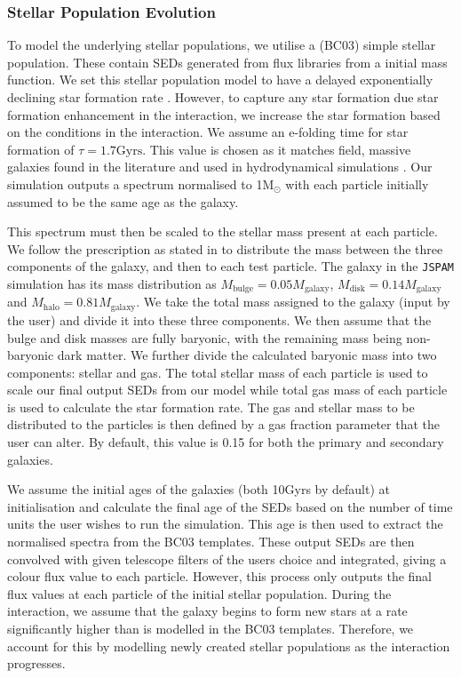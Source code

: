 \subsubsection{Stellar Population Evolution}\label{Stellar_Pop_Evol}
To model the underlying stellar populations, we utilise a \citet{2003MNRAS.344.1000B} (BC03) simple stellar population. These contain SEDs generated from flux libraries from a \citet{2003PASP..115..763C} initial mass function. We set this stellar population model to have a delayed exponentially declining star formation rate \citep{2009ApJ...690..802J, 2013ApJ...762L..15P,2014arXiv1404.0402S, 2019A&A...622A.103B}. However, to capture any star formation due star formation enhancement in the interaction, we increase the star formation based on the conditions in the interaction. We assume an e-folding time for star formation of $\tau = 1.7\text{Gyrs}$. This value is chosen as it matches field, massive galaxies found in the literature \citep[e.g][]{2010ApJ...721..193P} and used in hydrodynamical simulations \citep[e.g.][]{2022ApJ...941....5J}. Our simulation outputs a spectrum normalised to 1M$_{\odot}$ with each particle initially assumed to be the same age as the galaxy.

This spectrum must then be scaled to the stellar mass present at each particle. We follow the prescription as stated in \citet{2016A&C....16...26W} to distribute the mass between the three components of the galaxy, and then to each test particle. The galaxy in the \texttt{JSPAM} simulation has its mass distribution as $M_{\text{bulge}} = 0.05M_{\text{galaxy}}$, $M_{\text{disk}} = 0.14M_{\text{galaxy}}$ and $M_{\text{halo}} = 0.81M_{\text{galaxy}}$. We take the total mass assigned to the galaxy (input by the user) and divide it into these three components. We then assume that the bulge and disk masses are fully baryonic, with the remaining mass being non-baryonic dark matter. We further divide the calculated baryonic mass into two components: stellar and gas. The total stellar mass of each particle is used to scale our final output SEDs from our model while total gas mass of each particle is used to calculate the star formation rate. The gas and stellar mass to be distributed to the particles is then defined by a gas fraction parameter that the user can alter. By default, this value is 0.15 for both the primary and secondary galaxies.

We assume the initial ages of the galaxies (both 10Gyrs by default) at initialisation and calculate the final age of the SEDs based on the number of time units the user wishes to run the simulation. This age is then used to extract the normalised spectra from the BC03 templates. These output SEDs are then convolved with given telescope filters of the users choice and integrated, giving a colour flux value to each particle. However, this process only outputs the final flux values at each particle of the initial stellar population. During the interaction, we assume that the galaxy begins to form new stars at a rate significantly higher than is modelled in the BC03 templates. Therefore, we account for this by modelling newly created stellar populations as the interaction progresses.

